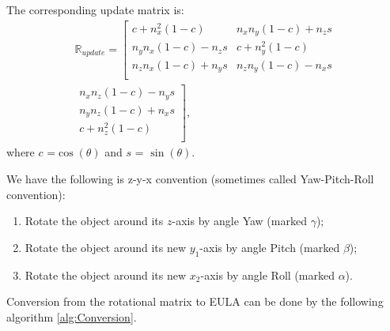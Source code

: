 \documentclass[10pt, conference, letterpaper]{IEEEtran}
\begin{document}
The corresponding update matrix is:
\begin{multline}
\mathbb{R}_{update} = \left[\begin{array}{ccc}
c+n_{x}^{2}(1-c) & n_{x}n_{y}(1-c)+n_{z}s\\
n_{y}n_{x}(1-c)-n_{z}s & c+n_{y}^{2}(1-c)\\
n_{z}n_{x}(1-c)+n_{y}s & n_{z}n_{y}(1-c)-n_{x}s\\
\end{array}\right.\\
\left.\begin{array}{cc}
n_{x}n_{z}(1-c)-n_{y}s\\
n_{y}n_{z}(1-c)+n_{x}s\\
c+n_{z}^{2}(1-c)\\
\end{array}\right],
\end{multline}
where $c$ =$\cos(\theta)$ and $s$ = $\sin(\theta)$.

We have the following is z-y-x convention (sometimes called  Yaw-Pitch-Roll convention):
\begin{enumerate}
  \item Rotate the object around its $z$-axis by angle Yaw (marked $\gamma$);
  \item Rotate the object around its new $y_{1}$-axis by angle Pitch (marked $\beta$);
  \item Rotate the object around its new $x_{2}$-axis by angle Roll (marked $\alpha$).
\end{enumerate}

Conversion from the rotational matrix to EULA can be done by the following algorithm \ref{alg:Conversion}.
\end{document}
